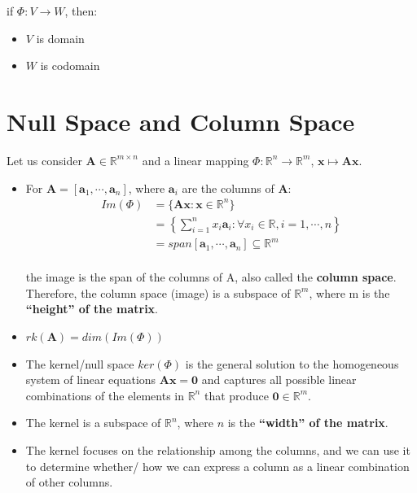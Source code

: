 if $\Phi : V \to W$, then:
\begin{itemize}
    \item $V$ is domain
    \item $W$ is codomain
\end{itemize}


\section{Null Space and Column Space \cite{mfml-1}}\label{Null Space and Column Space}

Let us consider $\mathbf{A} \in \mathbb{R}^{m\times n}$ and a linear mapping $\Phi : \mathbb{R}^n \to \mathbb{R}^m$, $\mathbf{x} \mapsto \mathbf{Ax}$.

\begin{itemize}
    \item For $\mathbf{A} = [\mathbf{a}_1, \cdots , \mathbf{a}_n]$, where $\mathbf{a}_i$ are the columns of $\mathbf{A}$:
    \begin{align*}
        \displaystyle
        Im(\Phi) 
        &= \{ \mathbf{Ax} : \mathbf{x} \in \mathbb{R}^n \} \\
        &= \left\{ \sum_{i=1}^{n} x_i\mathbf{a}_i : \forall x_i \in \mathbb{R}, i=1,\cdots,n \right\} \\
        &= span[\mathbf{a}_1,\cdots, \mathbf{a}_n] \subseteq \mathbb{R}^m \\
    \end{align*}

    the image is the span of the columns of A, also called the \textbf{column space}. Therefore, the column space (image) is a subspace of $\mathbb{R}^m$, where m is the \textbf{“height” of the matrix}.

    \item $rk(\mathbf{A}) = dim(Im(\Phi))$

    \item The kernel/null space $ker(\Phi)$ is the general solution to the homogeneous system of linear equations $\mathbf{Ax = 0}$ and captures all possible linear combinations of the elements in $\mathbb{R}^n$ that produce $\mathbf{0} \in \mathbb{R}^m$.

    \item The kernel is a subspace of $\mathbb{R}^n$, where $n$ is the \textbf{“width” of the matrix}.

    \item The kernel focuses on the relationship among the columns, and we can use it to determine whether/ how we can express a column as a linear combination of other columns.
\end{itemize}



